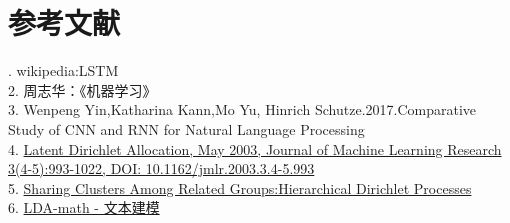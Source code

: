 \documentclass[a4paper]{article}
\begin{document}
   \section{参考文献}
   . wikipedia:LSTM\\
   2. 周志华：《机器学习》\\
   3. Wenpeng Yin,Katharina Kann,Mo Yu, Hinrich Schutze.2017.Comparative Study of CNN and RNN for Natural Language Processing  \\
   4. \href {http://www.jmlr.org/papers/volume3/blei03a/blei03a.pdf}
   {Latent Dirichlet Allocation, May 2003, Journal of Machine Learning Research 3(4-5):993-1022, DOI: 10.1162/jmlr.2003.3.4-5.993}\\
   5. \href {http://papers.nips.cc/paper/2698-sharing-clusters-among-related-groups-hierarchical-dirichlet-processes.pdf}
   {Sharing Clusters Among Related Groups:Hierarchical Dirichlet Processes}\\
   6. \href {https://cosx.org/2013/03/lda-math-text-modeling/}
   {LDA-math - 文本建模}
   
\end{document}

